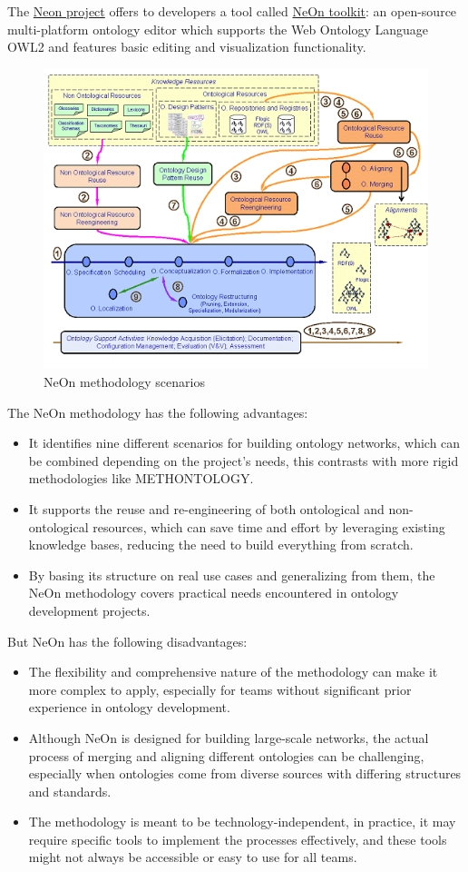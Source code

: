 The \href{http://neon-project.org/nw/Welcome_to_the_NeOn_Project.html}{Neon project} offers to developers a tool called \href{http://neon-toolkit.org/wiki/Main_Page.html}{NeOn toolkit}: an open-source multi-platform ontology editor which supports the Web Ontology Language OWL2 and features basic editing and visualization functionality.\cite{erdmann2011overview}\\
\begin{figure}[H]
    \centering
    \includegraphics[width=0.5\linewidth]{Figures/fig_2.png}
    \caption{NeOn methodology scenarios}
    \label{fig:enter-label}
\end{figure}
The NeOn methodology has the following advantages:
\begin{itemize}
    \item It identifies nine different scenarios for building ontology networks, which can be combined depending on the project’s needs, this contrasts with more rigid methodologies like METHONTOLOGY.

    \item It supports the reuse and re-engineering of both ontological and non-ontological resources, which can save time and effort by leveraging existing knowledge bases, reducing the need to build everything from scratch.

    \item By basing its structure on real use cases and generalizing from them, the NeOn methodology covers practical needs encountered in ontology development projects.
\end{itemize}
But NeOn has the following disadvantages:
\begin{itemize}
    \item The flexibility and comprehensive nature of the methodology can make it more complex to apply, especially for teams without significant prior experience in ontology development. 

    \item Although NeOn is designed for building large-scale networks, the actual process of merging and aligning different ontologies can be challenging, especially when ontologies come from diverse sources with differing structures and standards.

    \item The methodology is meant to be technology-independent, in practice, it may require specific tools to implement the processes effectively, and these tools might not always be accessible or easy to use for all teams.
\end{itemize}

